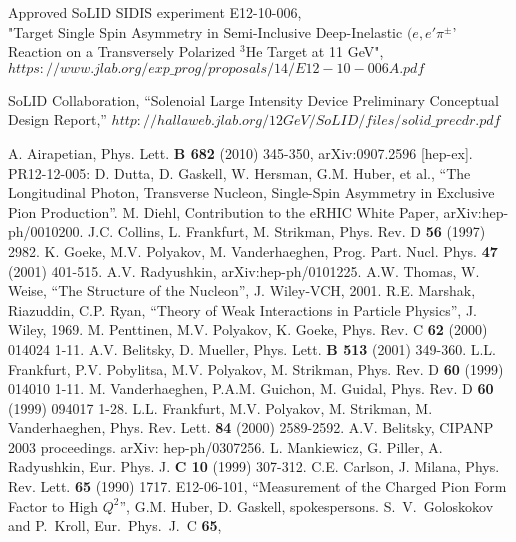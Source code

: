 \clearpage
\begin{thebibliography}{}

  Approved SoLID SIDIS experiment E12-10-006,\\
  "Target Single Spin Asymmetry in Semi-Inclusive Deep-Inelastic $(e,e'\pi^{\pm}$' Reaction on a Transversely Polarized $\mathrm{^{3}He}$ Target at 11 GeV",\\
$https://www.jlab.org/exp\_prog/proposals/14/E12-10-006A.pdf$

  SoLID Collaboration, ``Solenoial Large Intensity Device Preliminary Conceptual Design Report,''
  $http://hallaweb.jlab.org/12GeV/SoLID/files/solid\_precdr.pdf$
  
 A. Airapetian, Phys. Lett. {\bf B 682} (2010) 345-350,
  arXiv:0907.2596 [hep-ex].
 PR12-12-005:
D. Dutta, D. Gaskell, W. Hersman, G.M. Huber, et al., ``The Longitudinal
Photon, Transverse Nucleon, Single-Spin Asymmetry in Exclusive Pion
Production''.
 M. Diehl, Contribution to the eRHIC White Paper,
arXiv:hep-ph/0010200.
 J.C. Collins, L. Frankfurt, M. Strikman, Phys. Rev. D {\bf 56}
  (1997) 2982.
 K. Goeke, M.V. Polyakov, M. Vanderhaeghen,
  Prog. Part. Nucl. Phys. {\bf 47} (2001) 401-515.
 A.V. Radyushkin, arXiv:hep-ph/0101225.
 A.W. Thomas, W. Weise, ``The Structure of the Nucleon'',
  J. Wiley-VCH, 2001.
 R.E. Marshak, Riazuddin, C.P. Ryan, ``Theory of Weak
  Interactions in Particle Physics'', J. Wiley, 1969.
 M. Penttinen, M.V. Polyakov, K. Goeke, Phys. Rev. C {\bf 62}
  (2000) 014024 1-11.
 A.V. Belitsky, D. Mueller, Phys. Lett. {\bf B 513}
  (2001) 349-360.
 L.L. Frankfurt, P.V. Pobylitsa, M.V. Polyakov, M. Strikman,
  Phys. Rev. D {\bf 60} (1999) 014010 1-11.
 M. Vanderhaeghen, P.A.M. Guichon, M. Guidal, Phys. Rev. D 
  {\bf 60} (1999) 094017 1-28.
 L.L. Frankfurt, M.V. Polyakov, M. Strikman, M. Vanderhaeghen,
  Phys. Rev. Lett. {\bf 84} (2000) 2589-2592.
 A.V. Belitsky, CIPANP 2003 proceedings.  arXiv:
  hep-ph/0307256.
 L. Mankiewicz, G. Piller, A. Radyushkin, Eur. Phys. J. {\bf C
    10} (1999) 307-312.
 C.E. Carlson, J. Milana, Phys. Rev. Lett. {\bf 65} (1990) 1717.
 E12-06-101, ``Measurement of the Charged Pion Form Factor to
  High $Q^2$'', G.M. Huber, D. Gaskell, spokespersons.
 S.~V.~Goloskokov and P.~Kroll, Eur.\ Phys.\ J.\ C {\bf 65},

\end{thebibliography}
